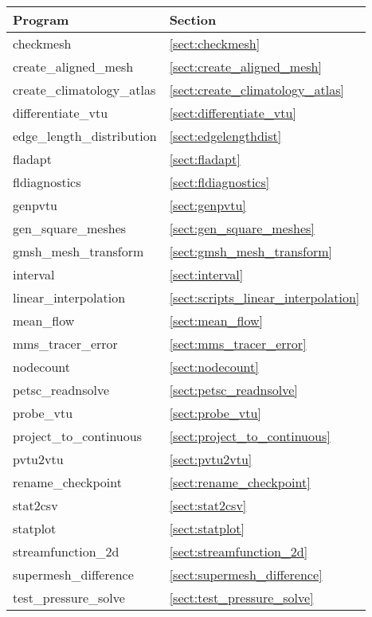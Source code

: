 \begin{table}
\begin{center}
  \begin{tabular}{| l | l |}
    \hline
	Program					& Section 				\\
    \hline
	checkmesh				& \ref{sect:checkmesh}			\\
	create\_aligned\_mesh 			& \ref{sect:create_aligned_mesh}	\\
	create\_climatology\_atlas		& \ref{sect:create_climatology_atlas}	\\
	differentiate\_vtu          		& \ref{sect:differentiate_vtu}		\\
	edge\_length\_distribution		& \ref{sect:edgelengthdist} 		\\
	fladapt					& \ref{sect:fladapt}			\\
	fldiagnostics				& \ref{sect:fldiagnostics}		\\
	genpvtu					& \ref{sect:genpvtu}			\\
	gen\_square\_meshes			& \ref{sect:gen_square_meshes} 		\\
	gmsh\_mesh\_transform			& \ref{sect:gmsh_mesh_transform}	\\
	interval				& \ref{sect:interval} 			\\
	linear\_interpolation			& \ref{sect:scripts_linear_interpolation} \\	
	mean\_flow				& \ref{sect:mean_flow}			\\
	mms\_tracer\_error			& \ref{sect:mms_tracer_error}		\\
	nodecount				& \ref{sect:nodecount}			\\
	petsc\_readnsolve			& \ref{sect:petsc_readnsolve} 		\\
	probe\_vtu  				& \ref{sect:probe_vtu} 			\\
	project\_to\_continuous			& \ref{sect:project_to_continuous} 	\\
	pvtu2vtu				& \ref{sect:pvtu2vtu}			\\
	rename\_checkpoint			& \ref{sect:rename_checkpoint}		\\
	stat2csv				& \ref{sect:stat2csv}			\\
	statplot				& \ref{sect:statplot} 			\\
	streamfunction\_2d			& \ref{sect:streamfunction_2d} 		\\
	supermesh\_difference			& \ref{sect:supermesh_difference} 	\\	
	test\_pressure\_solve			& \ref{sect:test_pressure_solve}	\\

\end{tabular}
\end{center}
\end{table}
